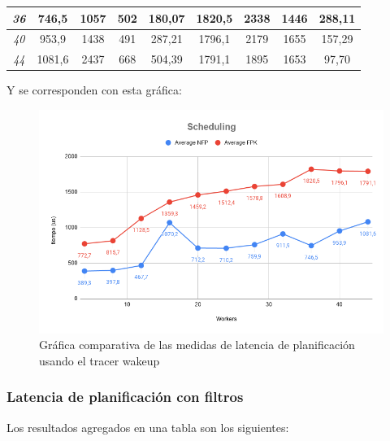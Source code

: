 \documentclass[../main.tex]{subfiles}
\begin{document}
\begin{table}[htp]
\begin{tabular}{|c|c|c|c|c|c|c|c|c|}
\textit{36}                          & 746,5        & 1057         & 502          & 180,07           & 1820,5       & 2338         & 1446         & 288,11           \\ \hline
\textit{40}                          & 953,9        & 1438         & 491          & 287,21           & 1796,1       & 2179         & 1655         & 157,29           \\ \hline
\textit{44}                          & 1081,6       & 2437         & 668          & 504,39           & 1791,1       & 1895         & 1653         & 97,70            \\ \hline
\end{tabular}
\end{table}

Y se corresponden con esta gráfica:

\begin{figure}[htp]
    \centering
    \includegraphics[width=15cm]{imagenes/graficas/Scheduling.png}
    \caption{Gráfica comparativa de las medidas de latencia de planificación usando el tracer wakeup}
\end{figure}

\subsubsection{Latencia de planificación con filtros}

Los resultados agregados en una tabla son los siguientes:
\end{document}

